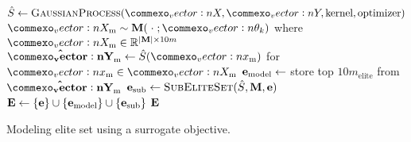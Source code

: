 \begin{algorithm}[ht]
  \begin{algorithmic}
    \State $\surrogate \leftarrow \textproc{GaussianProcess}(\mat{X}, \mat{Y}, \text{kernel}, \text{optimizer})$  %
    \State $\mat{X}_\text{m} \sim \M(\;\cdot\;; \vec{\theta}_k)$ where $\mat{X}_\text{m} \in \R^{|\M| \times {10m}}$ 
    \State $\mathbf{\hat{\mat{Y}}}_\text{m} \leftarrow \surrogate(\vec{x}_\text{m})$ for $\vec{x}_\text{m} \in \mat{X}_\text{m}$ 
    \State $\mathbf{e}_\text{model} \leftarrow$ store top $10m_\text{elite}$ from $\mathbf{\hat{\mat{Y}}}_\text{m}$ 
    \State $\e_\text{sub} \leftarrow \textproc{SubEliteSet}(\surrogate, \M, \e)$ 
    \State $\mathbf{E} \leftarrow \{ \mathbf{e} \} \cup \{ \mathbf{e}_\text{model} \} \cup \{ \mathbf{e}_\text{sub} \}$ 
    \State \Return $\mathbf{E}$
  \EndFunction
  \end{algorithmic}
  \caption{\label{alg:model_elite_set} Modeling elite set using a surrogate objective.}
\end{algorithm}
